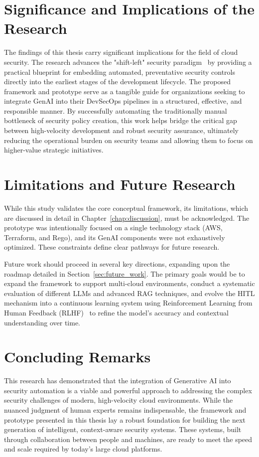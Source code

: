 \section{Significance and Implications of the Research}

The findings of this thesis carry significant implications for the field of cloud security. The research advances the "shift-left" security paradigm~\cite{akto_shift_2025} by providing a practical blueprint for embedding automated, preventative security controls directly into the earliest stages of the development lifecycle. The proposed framework and prototype serve as a tangible guide for organizations seeking to integrate GenAI into their DevSecOps pipelines in a structured, effective, and responsible manner. By successfully automating the traditionally manual bottleneck of security policy creation, this work helps bridge the critical gap between high-velocity development and robust security assurance, ultimately reducing the operational burden on security teams and allowing them to focus on higher-value strategic initiatives.

\section{Limitations and Future Research}

While this study validates the core conceptual framework, its limitations, which are discussed in detail in Chapter~\ref{chap:discussion}, must be acknowledged. The prototype was intentionally focused on a single technology stack (AWS, Terraform, and Rego), and its GenAI components were not exhaustively optimized. These constraints define clear pathways for future research.

Future work should proceed in several key directions, expanding upon the roadmap detailed in Section~\ref{sec:future_work}. The primary goals would be to expand the framework to support multi-cloud environments, conduct a systematic evaluation of different LLMs and advanced RAG techniques, and evolve the HITL mechanism into a continuous learning system using Reinforcement Learning from Human Feedback (RLHF)~\cite{ouyang_training_2022} to refine the model’s accuracy and contextual understanding over time.

\section{Concluding Remarks}

This research has demonstrated that the integration of Generative AI into security automation is a viable and powerful approach to addressing the complex security challenges of modern, high-velocity cloud environments. While the nuanced judgment of human experts remains indispensable, the framework and prototype presented in this thesis lay a robust foundation for building the next generation of intelligent, context-aware security systems. These systems, built through collaboration between people and machines, are ready to meet the speed and scale required by today’s large cloud platforms.